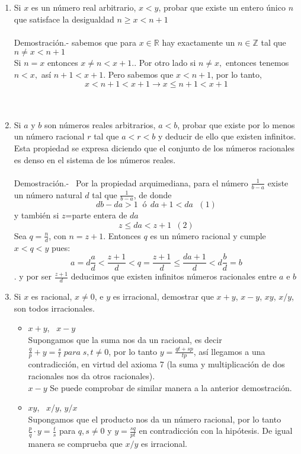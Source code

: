 \begin{enumerate}
\item Si $x$ es un número real arbitrario, $x<y$, probar que existe un entero único $n$ que satisface la desigualdad $n \geq x < n+1$\\\\
Demostración.- \; sabemos que para $x \in \mathbb{R}$ hay exactamente un $n \in \mathbb{Z}$ tal que $n \neq x < n+1$\\
Si $n=x$ entonces $x \neq n < x+1.$. Por otro lado si $n \neq x,$ entonces tenemos $n<x,$ así $n+1 < x+1$. Pero sabemos que $x<n+1$, por lo tanto, $$x<n+1<x+1 \rightarrow x \leq n+1 < x+1$$\\\\

\item Si $a$ y $b$ son números reales arbitrarios, $a<b$, probar que existe por lo menos un número racional $r$ tal que $a<r<b$ y deducir de ello que existen infinitos. Esta propiedad se expresa diciendo que el conjunto de los números racionales es denso en el sistema de los números reales.\\\\
Demostración.- \, Por la propiedad arquimediana, para el número $\displaystyle\frac{1}{b-a}$ existe un número natural $d$ tal que $\displaystyle\frac{1}{b-a}$, de donde 
$$db-da>1 \; \; ó \; \, da+1<da \; \, \, (1)$$
y también si $z$=parte entera de $da$
$$z\leq da < z+1 \, \, \, (2)$$
Sea $q=\displaystyle\frac{n}{d}$, con $n=z+1$. Entonces $q$ es un número racional y cumple $x<q<y$ pues:
$$a= d\displaystyle\frac{a}{d} < \frac{z+1}{d}<q=\frac{z+1}{d}\leq \frac{da+1}{d}<d\frac{b}{d}=b$$. y por ser $\displaystyle\frac{z+1}{d}$ deducimos que existen infinitos números racionales entre $a$ e $b$\\

\item Si $x$ es racional, $x\neq 0$, e $y$ es irracional, demostrar que $x+y$, $x-y$, $xy$, $x/y$, son todos irracionales.
\begin{itemize}
\item $x+y$, \, $x-y$\\
Supongamos que la suma nos da un racional, es decir $\displaystyle\frac{q}{p}+y=\frac{s}{t}\; para \; s,t\neq 0$, por lo tanto $y = \displaystyle\frac{qt+sp}{tp}$, así llegamos a una contradicción, en virtud del axioma 7 (la suma y multiplicación de dos racionales nos da otros racionales).\\
$x-y$ Se puede comprobar de similar manera a la anterior demostración.\\
\item $xy$, \, $x/y$, \; $y/x$\\
Supongamos que el producto nos da un número racional, por lo tanto $\frac{p}{q}\cdot y = \displaystyle\frac{t}{s}$ para $q,s \neq 0$ y $ \displaystyle y = \frac{sq}{pt}$ en contradicción con la hipótesis. De igual manera se comprueba que $x/y$ es irracional.\\\\
\end{itemize}


\end{enumerate}
